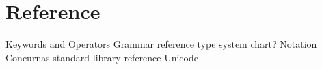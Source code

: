 \documentclass[index]{subfiles}
\begin{document}
	\chapter[Reference]{Reference}

Keywords and Operators
Grammar reference
type system chart?
Notation
Concurnas standard library reference
Unicode
\end{document}
